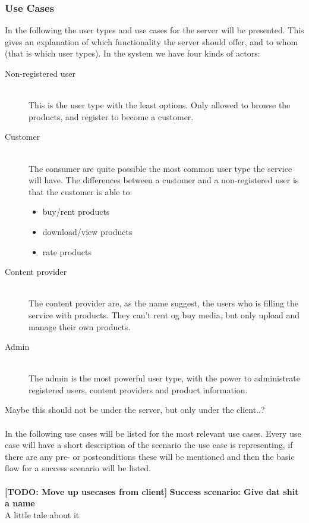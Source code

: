 \subsubsection{Use Cases}
In the following the user types and use cases for the server will be presented. This gives an explanation of which functionality the server should offer, and to whom (that is which user types).
\label{s_actor-goal-list}
In the system we have four kinds of actors:
\begin{description}
	\item [Non-registered user] \hfill \\
		This is the user type with the least options. Only allowed to browse the products, and register to become a customer.
	\item [Customer]  \hfill \\
		The consumer are quite possible the most common user type the service will have. The differences between a customer and a non-registered user is that the customer is able to:
		\begin{itemize}
			\item buy/rent products
			\item download/view products
			\item rate products
		\end{itemize}
	\item [Content provider] \hfill \\
		The content provider are, as the name suggest, the users who is filling the service with products. They can't rent og buy media, but only upload and manage their own products.
	\item [Admin] \hfill \\
		The admin is the most powerful user type, with the power to administrate registered users, content providers and product information.
\end{description}

Maybe this should not be under the server, but only under the client..?\\\\
In the following use cases will be listed for the most relevant use cases. Every use case will have a short description of the scenario the use case is representing, if there are any pre- or postconditions these will be mentioned and then the basic flow for a success scenario will be listed.
\\\\

\textbf{[TODO: Move up usecases from client]}
\textbf{Success scenario: Give dat shit a name} \\
A little tale about it

